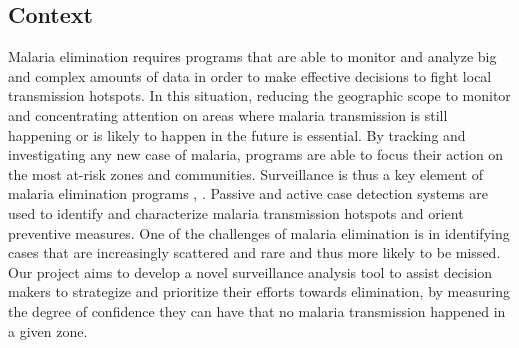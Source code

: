 \subsection{Context}

Malaria elimination requires programs that are able to monitor and analyze big and complex amounts of data in order to make effective decisions to fight local transmission hotspots. In this situation, reducing the geographic scope to monitor and concentrating attention on areas where malaria transmission is still happening or is likely to happen in the future is essential\cite{ShrinkingMalariaMap}. By tracking and investigating any new case of malaria, programs are able to focus their action on the most at-risk zones and communities. Surveillance is thus a key element of malaria elimination programs\cite{SurvSystems} , \cite{WHOSurveillance}. Passive and active case detection systems are used to identify and characterize malaria transmission hotspots and orient preventive measures. One of the challenges of malaria elimination is in identifying cases that are increasingly scattered and rare and thus more likely to be missed\cite{ChangingEpidemiology}. Our project aims to develop a novel surveillance analysis tool to assist decision makers to strategize and prioritize their efforts towards elimination, by measuring the degree of confidence they can have that no malaria transmission happened in a given zone.

